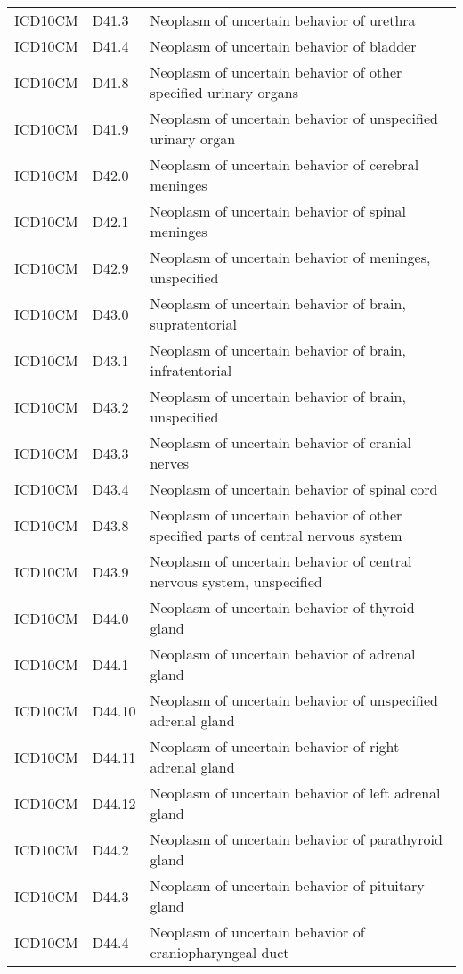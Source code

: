 \begin{longtable}{p{}p{}p{}}
  ICD10CM & D41.3 & Neoplasm of uncertain behavior of urethra \\ 
  ICD10CM & D41.4 & Neoplasm of uncertain behavior of bladder \\ 
  ICD10CM & D41.8 & Neoplasm of uncertain behavior of other specified urinary organs \\ 
  ICD10CM & D41.9 & Neoplasm of uncertain behavior of unspecified urinary organ \\ 
  ICD10CM & D42.0 & Neoplasm of uncertain behavior of cerebral meninges \\ 
  ICD10CM & D42.1 & Neoplasm of uncertain behavior of spinal meninges \\ 
  ICD10CM & D42.9 & Neoplasm of uncertain behavior of meninges, unspecified \\ 
  ICD10CM & D43.0 & Neoplasm of uncertain behavior of brain, supratentorial \\ 
  ICD10CM & D43.1 & Neoplasm of uncertain behavior of brain, infratentorial \\ 
  ICD10CM & D43.2 & Neoplasm of uncertain behavior of brain, unspecified \\ 
  ICD10CM & D43.3 & Neoplasm of uncertain behavior of cranial nerves \\ 
  ICD10CM & D43.4 & Neoplasm of uncertain behavior of spinal cord \\ 
  ICD10CM & D43.8 & Neoplasm of uncertain behavior of other specified parts of central nervous system \\ 
  ICD10CM & D43.9 & Neoplasm of uncertain behavior of central nervous system, unspecified \\ 
  ICD10CM & D44.0 & Neoplasm of uncertain behavior of thyroid gland \\ 
  ICD10CM & D44.1 & Neoplasm of uncertain behavior of adrenal gland \\ 
  ICD10CM & D44.10 & Neoplasm of uncertain behavior of unspecified adrenal gland \\ 
  ICD10CM & D44.11 & Neoplasm of uncertain behavior of right adrenal gland \\ 
  ICD10CM & D44.12 & Neoplasm of uncertain behavior of left adrenal gland \\ 
  ICD10CM & D44.2 & Neoplasm of uncertain behavior of parathyroid gland \\ 
  ICD10CM & D44.3 & Neoplasm of uncertain behavior of pituitary gland \\ 
  ICD10CM & D44.4 & Neoplasm of uncertain behavior of craniopharyngeal duct \\ 

\end{longtable}
